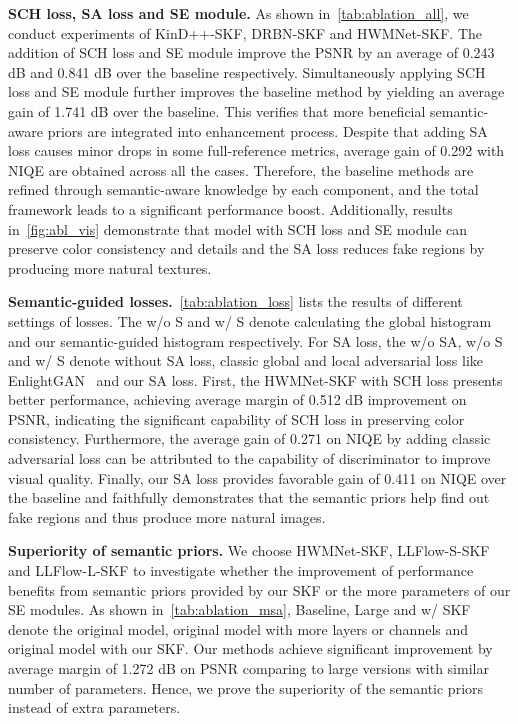 \documentclass[10pt,twocolumn,letterpaper]{article}
\begin{document}
\textbf{SCH loss, SA loss and SE module.} As shown in~\cref{tab:ablation_all}, we conduct experiments of KinD++-SKF, DRBN-SKF and HWMNet-SKF. The addition of SCH loss and SE module improve the PSNR by an average of 0.243 dB and 0.841 dB over the baseline respectively. Simultaneously applying SCH loss and SE module further improves the baseline method by yielding an average gain of 1.741 dB over the baseline. This verifies that more beneficial semantic-aware priors are integrated into enhancement process. Despite that adding SA loss causes minor drops in some full-reference metrics, average gain of 0.292 with NIQE are obtained across all the cases. Therefore, the baseline methods are refined through semantic-aware knowledge by each component, and the total framework leads to a significant performance boost. Additionally, results in~\cref{fig:abl_vis} demonstrate that model with SCH loss and SE module can preserve color consistency and details and the SA loss reduces fake regions by producing more natural textures. 

\textbf{Semantic-guided losses.}~\cref{tab:ablation_loss} lists the results of different settings of losses. The w/o S and w/ S denote calculating the global histogram and our semantic-guided histogram respectively. For SA loss, the w/o SA, w/o S and w/ S denote without SA loss, classic global and local adversarial loss like EnlightGAN~\cite{jiang2021enlightengan} and our SA loss. First, the HWMNet-SKF with SCH loss presents better performance, achieving average margin of 0.512 dB improvement on PSNR, indicating the significant capability of SCH loss in preserving color consistency. Furthermore, the average gain of 0.271 on NIQE by adding classic adversarial loss can be attributed to the capability of discriminator to improve visual quality. Finally, our SA loss provides favorable gain of 0.411 on NIQE over the baseline and faithfully demonstrates that the semantic priors help find out fake regions and thus produce more natural images.

\textbf{Superiority of semantic priors.} We choose HWMNet-SKF, LLFlow-S-SKF and LLFlow-L-SKF to investigate whether the improvement of performance benefits from semantic priors provided by our SKF or the more parameters of our SE modules. As shown in~\cref{tab:ablation_msa}, Baseline, Large and w/ SKF denote the original model, original model with more layers or channels and original model with our SKF. Our methods achieve significant improvement by average margin of 1.272 dB on PSNR comparing to large versions with similar number of parameters. Hence, we prove the superiority of the semantic priors instead of extra parameters. 
\end{document}

